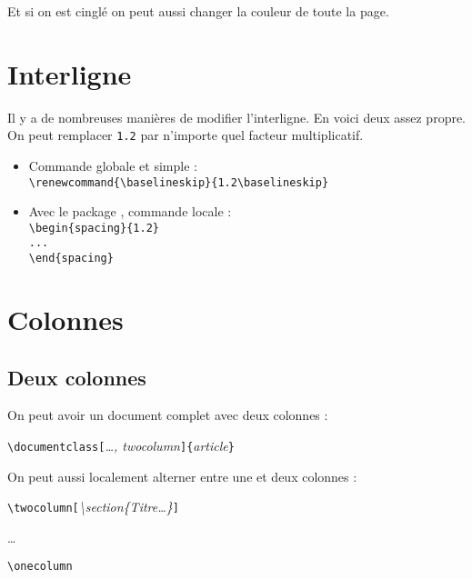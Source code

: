 \documentclass[a4paper, 11pt]{article}
\begin{document}
            Et si on est cinglé on peut aussi changer la couleur de toute la page. \pagecolor{lightgray}

\clearpage
\pagecolor{white}

    \section{Interligne}

        Il y a de nombreuses manières de modifier l'interligne. En voici deux assez propre. On peut remplacer \texttt{1.2} par n'importe quel facteur multiplicatif.

        \begin{itemize}
            \item Commande globale et simple : \\
            \verb!\renewcommand{\baselineskip}{1.2\baselineskip}!
            \item Avec le package , commande locale : \\
            \verb!\begin{spacing}{1.2}!\\
            \verb!...!\\
            \verb!\end{spacing}!
        \end{itemize}

    \section{Colonnes}

        \subsection{Deux colonnes}

            On peut avoir un document complet avec deux colonnes :

            \begin{center}
                \verb!\documentclass[!\textit{…, twocolumn}\verb!]{!\textit{article}\verb!}!
            \end{center}

            On peut aussi localement alterner entre une et deux colonnes :

            \begin{flushleft}
                \verb!\twocolumn[!\textit{\textbackslash section\{Titre…\}}\verb!]!

                …

                \verb!\onecolumn!
            \end{flushleft}
\end{document}
